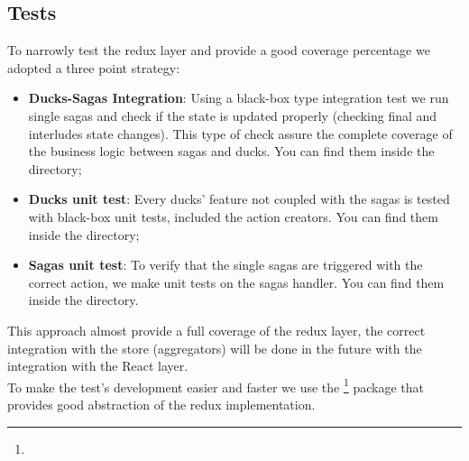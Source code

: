\documentclass[../redux]{subfiles}
\begin{document}
	\subsection{Tests}
	To narrowly test the redux layer and provide a good coverage percentage we adopted a three point strategy:
	\begin{itemize}
		\item \textbf{Ducks-Sagas Integration}: Using a black-box type integration test we run single sagas and check if the state is updated properly (checking final and interludes state changes). This type of check assure the complete coverage of the business logic between sagas and ducks. You can find them inside the  directory;
		\item \textbf{Ducks unit test}: Every ducks' feature not coupled with the sagas is tested with black-box unit tests, included the action creators. You can find them inside the  directory;
		\item \textbf{Sagas unit test}: To verify that the single sagas are triggered with the correct action, we make unit tests on the sagas handler. You can find them inside the  directory.
	\end{itemize}
	This approach almost provide a full coverage of the redux layer, the correct integration with the store (aggregators) will be done in the future with the integration with the React layer.\\
	To make the test's development easier and faster we use the \footnote{} package that provides good abstraction of the redux implementation.
\end{document}

